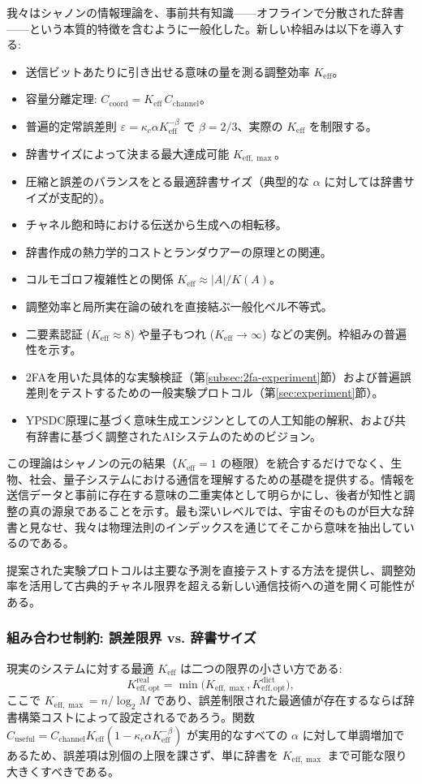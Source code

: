 \documentclass[12pt,a4paper]{article}
\theoremstyle{definition}
\theoremstyle{remark}
\newcommand{\Keff}{K_{\mathrm{eff}}}
\newcommand{\Keffopt}{K_{\mathrm{eff},\mathrm{opt}}}
\newcommand{\Keffmax}{K_{\mathrm{eff},\max}}
\begin{document}
	我々はシャノンの情報理論を、事前共有知識——オフラインで分散された辞書——という本質的特徴を含むように一般化した。新しい枠組みは以下を導入する:
	\begin{itemize}
		\item 送信ビットあたりに引き出せる意味の量を測る調整効率 $\Keff$。
		\item 容量分離定理: $C_{\text{coord}} = \Keff \, C_{\text{channel}}$。
		\item 普遍的定常誤差則 $\varepsilon = \kappa_c\alpha K_{\mathrm{eff}}^{-\beta}$ で $\beta=2/3$、実際の $\Keff$ を制限する。
		\item 辞書サイズによって決まる最大達成可能 $\Keffmax$。
		\item 圧縮と誤差のバランスをとる最適辞書サイズ（典型的な $\alpha$ に対しては辞書サイズが支配的）。
		\item チャネル飽和時における伝送から生成への相転移。
		\item 辞書作成の熱力学的コストとランダウアーの原理との関連。
		\item コルモゴロフ複雑性との関係 $\Keff \approx |A|/K(A)$。
		\item 調整効率と局所実在論の破れを直接結ぶ一般化ベル不等式。
		\item 二要素認証 ($\Keff \approx 8$) や量子もつれ ($\Keff \to \infty$) などの実例。枠組みの普遍性を示す。
		\item 2FAを用いた具体的な実験検証（第\ref{subsec:2fa-experiment}節）および普遍誤差則をテストするための一般実験プロトコル（第\ref{sec:experiment}節）。
		\item YPSDC原理に基づく意味生成エンジンとしての人工知能の解釈、および共有辞書に基づく調整されたAIシステムのためのビジョン。
	\end{itemize}
	
	この理論はシャノンの元の結果（$\Keff=1$ の極限）を統合するだけでなく、生物、社会、量子システムにおける通信を理解するための基礎を提供する。情報を送信データと事前に存在する意味の二重実体として明らかにし、後者が知性と調整の真の源泉であることを示す。最も深いレベルでは、宇宙そのものが巨大な辞書と見なせ、我々は物理法則のインデックスを通じてそこから意味を抽出しているのである。
	
	提案された実験プロトコルは主要な予測を直接テストする方法を提供し、調整効率を活用して古典的チャネル限界を超える新しい通信技術への道を開く可能性がある。
	
	\subsubsection{組み合わせ制約: 誤差限界 vs. 辞書サイズ}
	現実のシステムに対する最適 $\Keff$ は二つの限界の小さい方である:
	\[
	\Keffopt^{\text{real}} = \min\bigl( \Keffmax, \Keffopt^{\text{dict}} \bigr),
	\]
	ここで $\Keffmax = n / \log_2 M$ であり、誤差制限された最適値が存在するならば辞書構築コストによって設定されるであろう。関数 $C_{\text{useful}} = C_{\text{channel}} \Keff (1 - \kappa_c\alpha K_{\mathrm{eff}}^{-\beta})$ が実用的なすべての $\alpha$ に対して単調増加であるため、誤差項は別個の上限を課さず、単に辞書を $\Keffmax$ まで可能な限り大きくすべきである。
	
\end{document}
